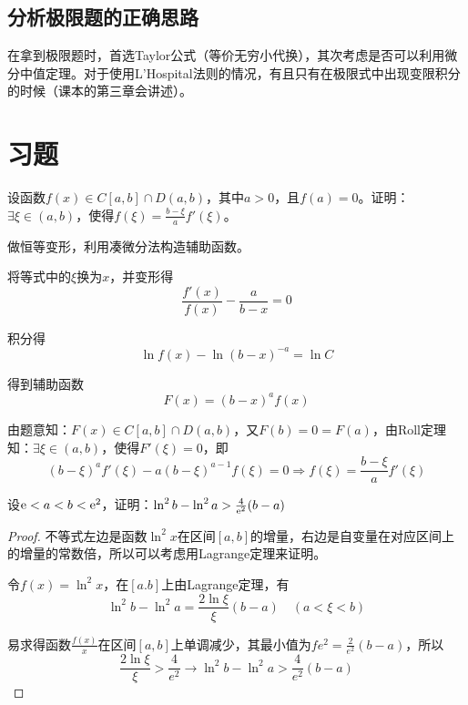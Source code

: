 \subsection{分析极限题的正确思路}
在拿到极限题时，首选Taylor公式（等价无穷小代换），其次考虑是否可以利用微分中值定理。对于使用L'Hospital法则的情况，有且只有在极限式中出现变限积分的时候（课本的第三章会讲述）。

\section{习题}

\begin{problem}
	设函数$f(x)\in C[a,b]\cap D(a,b)$，其中$a>0$，且$f(a)=0$。证明：$\exists\xi\in (a,b)$，使得$f(\xi)=\frac{b-\xi}{a}f'(\xi)$。
	\begin{solution}
		做恒等变形，利用凑微分法构造辅助函数。
		
		将等式中的$\xi$换为$x$，并变形得
		\[\frac{f'(x)}{f(x)}-\frac{a}{b-x}=0\]
		
		积分得
		\[\ln{f(x)}-\ln{(b-x)}^{-a}=\ln{C}\]
		
		得到辅助函数
		\[F(x)=(b-x)^{a}f(x)\]
		
		由题意知：$F(x)\in C[a,b]\cap D(a,b)$，又$F(b)=0=F(a)$，由Roll定理知：$\exists\xi\in (a,b)$，使得$F'(\xi)=0$，即
		\[(b-\xi)^{a}f'(\xi)-a(b-\xi)^{a-1}f(\xi)=0\Rightarrow f(\xi)=\frac{b-\xi}{a}f'(\xi)\]
	\end{solution}
\end{problem}

\begin{problem}
	设${\rm e}<a<b<{\rm e}^2$，证明：$\ln^2{b}-\ln^2{a}>\frac{4}{{\rm e}^2}(b-a)$
	
	\begin{proof}
		不等式左边是函数$\ln^2{x}$在区间$[a,b]$的增量，右边是自变量在对应区间上的增量的常数倍，所以可以考虑用Lagrange定理来证明。
		
		令$f(x)=\ln^2{x}$，在$[a.b]$上由Lagrange定理，有
		\[\ln^2{b}-\ln^2{a}=\frac{2\ln{\xi}}{\xi}(b-a)\quad (a<\xi <b)\]
		
		易求得函数$\frac{f(x)}{x}$在区间$[a,b]$上单调减少，其最小值为$f{e^2}=\frac{2}{e^2}(b-a)$，所以
		\[\frac{2\ln{\xi}}{\xi}>\frac{4}{e^2}\to \ln^2{b}-\ln^2{a}>\frac{4}{e^2}(b-a)\]
	\end{proof}
\end{problem}


